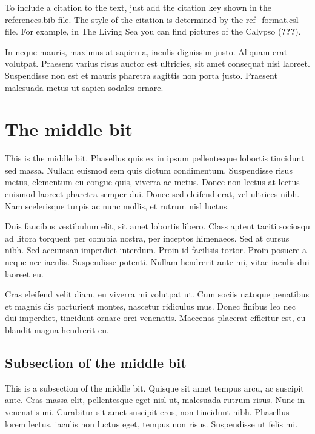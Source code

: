 \documentclass[12pt,a4paper,]{report}
\begin{document}
To include a citation to the text, just add the citation key shown in
the references.bib file. The style of the citation is determined by the
ref\_format.csl file. For example, in The Living Sea you can find
pictures of the Calypso ({\textbf{???}}).

In neque mauris, maximus at sapien a, iaculis dignissim justo. Aliquam
erat volutpat. Praesent varius risus auctor est ultricies, sit amet
consequat nisi laoreet. Suspendisse non est et mauris pharetra sagittis
non porta justo. Praesent malesuada metus ut sapien sodales ornare.

\section{The middle bit}\label{the-middle-bit}

This is the middle bit. Phasellus quis ex in ipsum pellentesque lobortis
tincidunt sed massa. Nullam euismod sem quis dictum condimentum.
Suspendisse risus metus, elementum eu congue quis, viverra ac metus.
Donec non lectus at lectus euismod laoreet pharetra semper dui. Donec
sed eleifend erat, vel ultrices nibh. Nam scelerisque turpis ac nunc
mollis, et rutrum nisl luctus.

Duis faucibus vestibulum elit, sit amet lobortis libero. Class aptent
taciti sociosqu ad litora torquent per conubia nostra, per inceptos
himenaeos. Sed at cursus nibh. Sed accumsan imperdiet interdum. Proin id
facilisis tortor. Proin posuere a neque nec iaculis. Suspendisse
potenti. Nullam hendrerit ante mi, vitae iaculis dui laoreet eu.

Cras eleifend velit diam, eu viverra mi volutpat ut. Cum sociis natoque
penatibus et magnis dis parturient montes, nascetur ridiculus mus. Donec
finibus leo nec dui imperdiet, tincidunt ornare orci venenatis. Maecenas
placerat efficitur est, eu blandit magna hendrerit eu.

\subsection{Subsection of the middle
bit}\label{subsection-of-the-middle-bit}

This is a subsection of the middle bit. Quisque sit amet tempus arcu, ac
suscipit ante. Cras massa elit, pellentesque eget nisl ut, malesuada
rutrum risus. Nunc in venenatis mi. Curabitur sit amet suscipit eros,
non tincidunt nibh. Phasellus lorem lectus, iaculis non luctus eget,
tempus non risus. Suspendisse ut felis mi.
\end{document}
